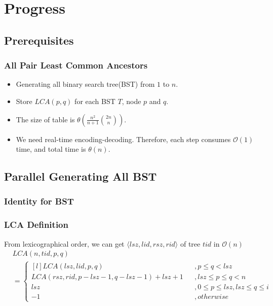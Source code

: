 \section{Progress}

\subsection{Prerequisites}
\begin{frame}
    \frametitle{All Pair Least Common Ancestors}
    \begin{itemize}
    	\setlength\itemsep{1em}
    	\item Generating all binary search tree(BST) from $1$ to $n$.
    	\item Store $\textit{LCA}(p, q)$ for each BST $T$, node $p$ and $q$.
		\item The size of table is $\theta(\frac{n^2}{n+1} \binom{2n}{n})$.
		\item We need real-time encoding-decoding. Therefore, 
			each step consumes $\mathcal{O}(1)$ time, 
			and total time is $\mathcal{\theta}(n)$.
    \end{itemize}
\end{frame}

\subsection{Parallel Generating All BST}
\begin{frame}
	\frametitle{Identity for BST}
		
		
		
\end{frame}

\begin{frame}
	\frametitle{LCA Definition}
	From lexicographical order, we can get $\langle\mathit{lsz},\mathit{lid},\mathit{rsz},\mathit{rid}\rangle$ 
	of tree $\mathit{tid}$ in $\mathcal{O}(n)$
	\begin{align*}
		& \mathit{LCA}(n, \mathit{tid}, p, q) \\
			&= \left\{\begin{matrix*}[l]
 				\mathit{LCA}(\mathit{lsz}, \mathit{lid}, p, q) &&, p \le q < \mathit{lsz}\\ 
 				\mathit{LCA}(\mathit{rsz}, \mathit{rid}, p-\mathit{lsz}-1, q-\mathit{lsz}-1)+\mathit{lsz}+1 &&, 
 						\mathit{lsz} \le p \le q < n \\ 
 				\mathit{lsz} && , 0 \le p \le \mathit{lsz}, \mathit{lsz} \le q \le i\\ 
 				-1 && ,\mathit{otherwise}
			\end{matrix*}\right.
	\end{align*}
\end{frame}

